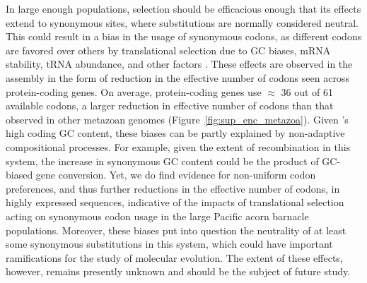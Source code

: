 In large enough populations, selection should be efficacious enough that its effects
extend to synonymous sites, where substitutions are normally considered neutral.
This could result in a bias in the usage of synonymous codons, as different codons are
favored over others by translational selection due to GC biases, mRNA stability, tRNA
abundance, and other factors \citep{galtier_codon_2018,presnyak_codon_2015}.
These effects are observed in the \bgla{} assembly in the form of reduction in the
effective number of codons seen across protein-coding genes.
On average, \bgla{} protein-coding genes use $\approx$ 36 out of 61 available codons, a
larger reduction in effective number of codons than that observed in other metazoan
genomes (Figure~\ref{fig:sup_enc_metazoa}).
Given \bgla{}'s high coding GC content, these biases can be partly explained by
non-adaptive compositional processes.
For example, given the extent of recombination in this system, the increase in synonymous
GC content could be the product of GC-biased gene conversion.
Yet, we do find evidence for non-uniform codon preferences, and thus further reductions in
the effective number of codons, in highly expressed sequences, indicative of the impacts of
translational selection acting on synonymous codon usage in the large Pacific acorn
barnacle populations.
Moreover, these biases put into question the neutrality of at least some synonymous
substitutions in this system, which could have important ramifications for the study of
molecular evolution.
The extent of these effects, however, remains presently unknown and should be the subject
of future study.
\vspace{0.1cm}


